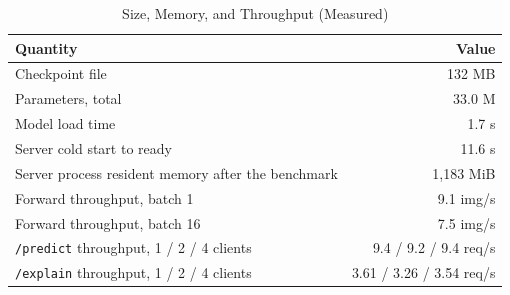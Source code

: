 \begin{table}[t]
\centering
\caption{Size, Memory, and Throughput (Measured)}
\label{tab:resources}
\footnotesize
\begin{tabular}{@{}p{4.6cm}r@{}}
\toprule
Quantity & Value \\
\midrule
Checkpoint file & 132 MB \\
Parameters, total & 33.0 M \\
Model load time & 1.7 s \\
Server cold start to ready & 11.6 s \\
Server process resident memory after the benchmark & 1,183 MiB \\
Forward throughput, batch 1 & 9.1 img/s \\
Forward throughput, batch 16 & 7.5 img/s \\
\texttt{/predict} throughput, 1 / 2 / 4 clients & 9.4 / 9.2 / 9.4 req/s \\
\texttt{/explain} throughput, 1 / 2 / 4 clients & 3.61 / 3.26 / 3.54 req/s \\
\bottomrule
\end{tabular}
\end{table}
